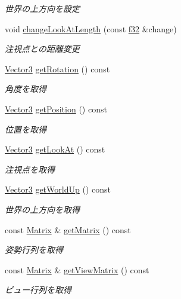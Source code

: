 \begin{DoxyCompactItemize}
\begin{DoxyCompactList}\small\item\em 世界の上方向を設定 \end{DoxyCompactList}\item 
void \hyperlink{class_camera_base_a5c20fbbaeb08a28959875bd00c17c6fb}{change\-Look\-At\-Length} (const \hyperlink{_main_8h_a5f6906312a689f27d70e9d086649d3fd}{f32} \&change)
\begin{DoxyCompactList}\small\item\em 注視点との距離変更 \end{DoxyCompactList}\item 
\hyperlink{struct_vector3}{Vector3} \hyperlink{class_camera_base_aa70dad729d671a46231c2d18d41a06ab}{get\-Rotation} () const 
\begin{DoxyCompactList}\small\item\em 角度を取得 \end{DoxyCompactList}\item 
\hyperlink{struct_vector3}{Vector3} \hyperlink{class_camera_base_ac2f00c1723997b460bb88d164563aefa}{get\-Position} () const 
\begin{DoxyCompactList}\small\item\em 位置を取得 \end{DoxyCompactList}\item 
\hyperlink{struct_vector3}{Vector3} \hyperlink{class_camera_base_ad8ea8b00adcde2da0f0ee1ef2703df87}{get\-Look\-At} () const 
\begin{DoxyCompactList}\small\item\em 注視点を取得 \end{DoxyCompactList}\item 
\hyperlink{struct_vector3}{Vector3} \hyperlink{class_camera_base_a302bc86bb3267b785edcd7d21ff83486}{get\-World\-Up} () const 
\begin{DoxyCompactList}\small\item\em 世界の上方向を取得 \end{DoxyCompactList}\item 
const \hyperlink{struct_matrix}{Matrix} \& \hyperlink{class_camera_base_aa5310b2074e4cb732986dc877eeb3af9}{get\-Matrix} () const 
\begin{DoxyCompactList}\small\item\em 姿勢行列を取得 \end{DoxyCompactList}\item 
const \hyperlink{struct_matrix}{Matrix} \& \hyperlink{class_camera_base_afddab07dc299807c1661e9e4dc6b8553}{get\-View\-Matrix} () const 
\begin{DoxyCompactList}\small\item\em ビュー行列を取得 \end{DoxyCompactList}\end{DoxyCompactItemize}

